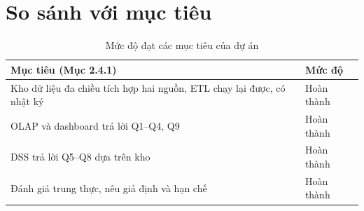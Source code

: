 \section{So sánh với mục tiêu}
\begin{table}[H]
\renewcommand{\arraystretch}{1.35}\setlength{\extrarowheight}{3pt}
\centering
\caption{Mức độ đạt các mục tiêu của dự án}
\small
\begin{tabularx}{\textwidth}{|X|p{2.2cm}|}
\hline
\textbf{Mục tiêu (Mục 2.4.1)} & \textbf{Mức độ} \\ \hline
Kho dữ liệu đa chiều tích hợp hai nguồn, ETL chạy lại được, có nhật ký & Hoàn thành \\ \hline
OLAP và dashboard trả lời Q1--Q4, Q9 & Hoàn thành \\ \hline
DSS trả lời Q5--Q8 dựa trên kho & Hoàn thành \\ \hline
Đánh giá trung thực, nêu giả định và hạn chế & Hoàn thành \\ \hline
\end{tabularx}
\end{table}
